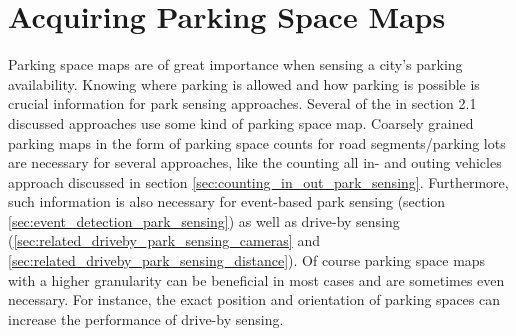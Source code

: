 \begin{table}

\caption{All used machine learning models to detect a city's parking space availability.}
\label{table:comparison_ml_approaches}
\end{table}




\section{Acquiring Parking Space Maps}
\label{sec:acquiring_parking_space_maps}

Parking space maps are of great importance when sensing a city's parking availability. Knowing where parking is allowed and how parking is possible is crucial information for park sensing approaches. Several of the in section 2.1 discussed approaches use some kind of parking space map. Coarsely grained parking maps in the form of parking space counts for road segments/parking lots are necessary for several approaches, like the counting all in- and outing vehicles approach discussed in section \ref{sec:counting_in_out_park_sensing}. Furthermore, such information is also necessary for event-based park sensing (section \ref{sec:event_detection_park_sensing}) as well as drive-by sensing (\ref{sec:related_driveby_park_sensing_cameras} and \ref{sec:related_driveby_park_sensing_distance}). Of course parking space maps with a higher granularity can be beneficial in most cases and are sometimes even necessary. For instance, the exact position and orientation of parking spaces can increase the performance of drive-by sensing.

